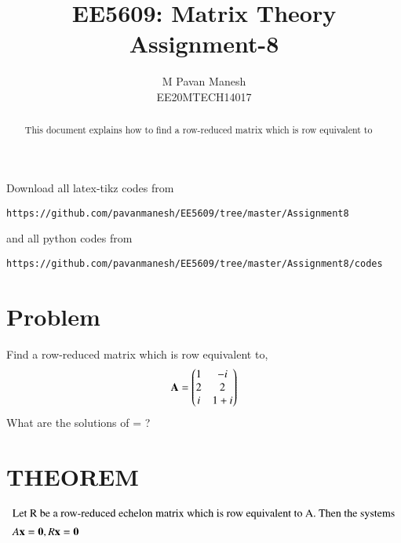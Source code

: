 \documentclass[journal,12pt,twocolumn]{IEEEtran}
\begin{document}
\makeatletter
{}
\makeatother
\let\StandardTheFigure\thefigure
\let\vec\mathbf
\renewcommand{\thefigure}{\theproblem}
\def\putbox#1#2#3{\makebox[0in][l]{\makebox[#1][l]{}\raisebox{\baselineskip}[0in][0in]{\raisebox{#2}[0in][0in]{#3}}}}
     \def\rightbox#1{\makebox[0in][r]{#1}}
     \def\centbox#1{\makebox[0in]{#1}}
     \def\topbox#1{\raisebox{-\baselineskip}[0in][0in]{#1}}
     \def\midbox#1{\raisebox{-0.5\baselineskip}[0in][0in]{#1}}
\vspace{3cm}
\title{EE5609: Matrix Theory\\
          Assignment-8\\}
\author{M Pavan Manesh\\
EE20MTECH14017 }
\maketitle
\newpage
\bigskip
\renewcommand{\thefigure}{\theenumi}
\renewcommand{\thetable}{\theenumi}
\begin{abstract}
This document explains how to find a row-reduced matrix which is row equivalent to
\end{abstract}
Download all latex-tikz codes from 
%
\begin{lstlisting}
https://github.com/pavanmanesh/EE5609/tree/master/Assignment8
\end{lstlisting}
and all python codes from 
\begin{lstlisting}
https://github.com/pavanmanesh/EE5609/tree/master/Assignment8/codes
\end{lstlisting}
%
\section{Problem}
Find a row-reduced matrix which is row equivalent to,
\begin{align}
\vec{A} = \myvec{1&-i\\2&2\\i& 1+i}\label{A}
\end{align}
What are the solutions of \vec{A}\vec{x}=\vec{0} ?
\section{THEOREM}
\begin{align}
\intertext{Let R be a row-reduced echelon matrix which is row equivalent to A. Then the systems}
A \vec{x} = \vec{0}, R \vec{x} = \vec{0} \label{th}\end{align}
\end{document}
